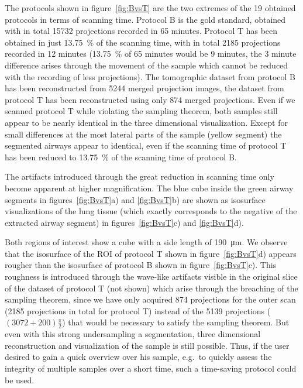 The protocols shown in figure~\ref{fig:BvsT} are the two extremes of the 19 obtained protocols  in terms of scanning time. Protocol B is the gold standard, obtained with in total 15732 projections recorded in 65 minutes. Protocol T has been obtained in just \SI{13.75}{\percent} of the scanning time, with in total 2185 projections recorded in 12 minutes (\SI{13.75}{\percent} of 65 minutes would be 9 minutes, the 3 minute difference arises through the movement of the sample which cannot be reduced with the recording of less projections). The tomographic dataset from protocol B has been reconstructed from 5244 merged projection images, the dataset from protocol T has been reconstructed using only 874 merged projections. Even if we scanned protocol T while violating the sampling theorem, both samples still appear to be nearly identical in the three dimensional visualization. Except for small differences at the most lateral parts of the sample (yellow segment) the segmented airways appear to identical, even if the scanning time of protocol T has been reduced to \SI{13.75}{\percent} of the scanning time of protocol B.

The artifacts introduced through the great reduction in scanning time only become apparent at higher magnification. The blue cube inside the green airway segments in figures~\ref{fig:BvsT}a) and \ref{fig:BvsT}b) are shown as isosurface visualizations of the lung tissue (which exactly corresponds to the negative of the extracted airway segment) in figures~\ref{fig:BvsT}c) and \ref{fig:BvsT}d).

Both regions of interest show a cube with a side length of \SI{190}{\micro\meter}. We observe that the isosurface of the ROI of protocol T shown in figure~\ref{fig:BvsT}d) appears rougher than the isosurface of protocol B shown in figure~\ref{fig:BvsT}c). This roughness is introduced through the wave-like artifacts visible in the original slice of the dataset of protocol T (not shown) which arise through the breaching of the sampling theorem, since we have only acquired 874 projections for the outer scan (2185 projections in total for protocol T) instead of the 5139 projections ($(3072+200)\frac{\pi}{2}$) that would be necessary to satisfy the sampling theorem. But even with this strong undersampling a segmentation, three dimensional reconstruction and visualization of the sample is still possible. Thus, if the user desired to gain a quick overview over his sample, e.g.\ to quickly assess the integrity of multiple samples over a short time, such a time-saving protocol could be used.

